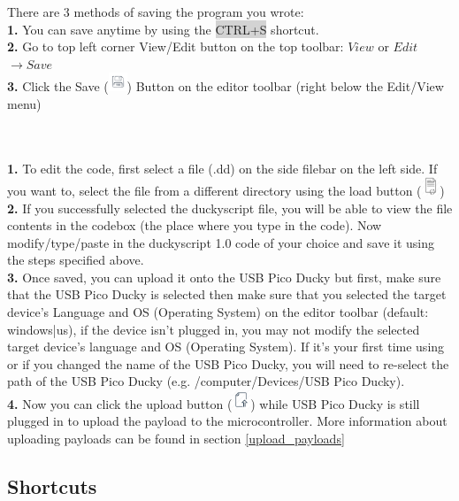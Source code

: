 \documentclass[a4paper,12pt]{article}
\begin{document}
There are 3 methods of saving the program you wrote:
\\\textbf{1.} You can save anytime by using the \colorbox{lightgray}{CTRL+S} shortcut. 
\\\textbf{2.} Go to top left corner View/Edit button on the top toolbar: $View$ or $Edit$ $\rightarrow Save$
\\\textbf{3.} Click the Save (\includegraphics[width=5.5mm]{pictures/black_bk/save.png}) Button on the editor toolbar (right below the Edit/View menu)

\ \\
\\\textbf{1.} To edit the code, first select a file (.dd) on the side filebar on the left side. If you want to, select the file from a different directory using the load button (\includegraphics[width=5.5mm]{pictures/black_bk/load.png})
\\\textbf{2.} If you successfully selected the duckyscript file, you will be able to view the file contents in the codebox (the place where you type in the code). Now modify/type/paste in the duckyscript 1.0 code of your choice and save it using the steps specified above.
\\\textbf{3.} Once saved, you can upload it onto the USB Pico Ducky but first, make sure that the USB Pico Ducky is selected then make sure that you selected the target device's Language and OS (Operating System) on the editor toolbar (default: windows|us), if the device isn't plugged in, you may not modify the selected target device's language and OS (Operating System). If it's your first time using or if you changed the name of the USB Pico Ducky, you will need to re-select the path of the USB Pico Ducky (e.g. /computer/Devices/USB Pico Ducky).
\\\textbf{4.} Now you can click the upload button (\includegraphics[width=5.5mm]{pictures/black_bk/upload.png}) while USB Pico Ducky is still plugged in to upload the payload to the microcontroller. More information about uploading payloads can be found in section \ref{upload_payloads}

\subsection{Shortcuts}
\end{document}
